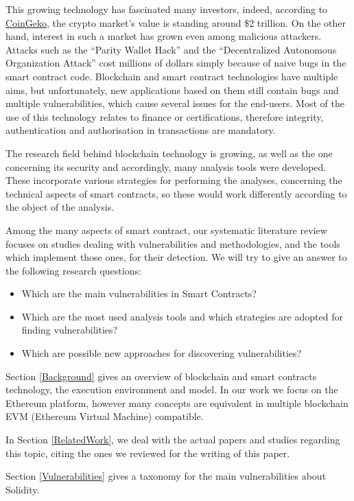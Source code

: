 \documentclass[a4paper,sigconf, language=french,
language=german, language=spanish, language=english]{acmart}
\begin{document}
This growing technology has fascinated many investors, indeed, according to \href{https://www.coingecko.com/}{CoinGeko}, 
the crypto market's value is standing around \$2 trillion. 
On the other hand, interest in such a market has grown even among malicious attackers. 
Attacks such as the “Parity Wallet Hack” and the “Decentralized Autonomous Organization Attack” cost millions of dollars simply because of 
naive bugs in the smart contract code. Blockchain and smart contract technologies have multiple aims, but unfortunately, new applications 
based on them still contain bugs and multiple vulnerabilities, which cause 
several issues for the end-users. Most of the use of this technology relates to finance or certifications, therefore integrity, 
authentication and authorisation in transactions are mandatory. 

The research field behind blockchain technology is growing, as well as the one concerning 
its security and accordingly, many analysis tools were developed. 
These incorporate various strategies for performing the analyses, concerning the technical aspects of smart contracts, 
so these would work differently according to the object of the analysis. 

Among the many aspects of smart contract, our systematic
literature review focuses on studies dealing with vulnerabilities and methodologies, and the tools which implement those ones, for their detection. We will try to give an answer to the following 
research questions:
\begin{itemize}
    \item Which are the main vulnerabilities in Smart Contracts?
    \item Which are the most used analysis tools and which strategies are adopted for finding vulnerabilities?
    \item Which are possible new approaches for discovering vulnerabilities?
\end{itemize}
Section \ref{Background} gives an overview of blockchain and smart contracts technology, the execution environment and model. 
In our work we focus on the Ethereum platform, however many concepts are equivalent in multiple blockchain EVM (Ethereum Virtual Machine) compatible.

In Section \ref{RelatedWork}, we deal with the actual papers and studies regarding this topic, citing the ones we reviewed for the writing of this paper.

Section \ref{Vulnerabilities} gives a taxonomy for the main vulnerabilities about Solidity. 
\end{document}
